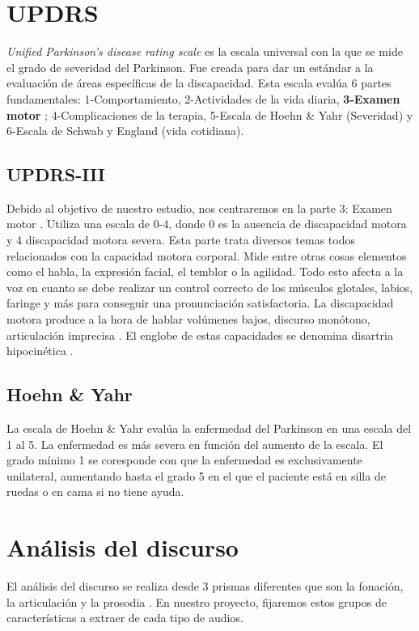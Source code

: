 \section{UPDRS}
\textit{Unified Parkinson's disease rating scale} \cite{updrs} es la escala universal con la que se mide el grado de severidad del Parkinson. Fue creada para dar un estándar a la evaluación de áreas específicas de la discapacidad. Esta escala evalúa 6 partes fundamentales: 1-Comportamiento, 2-Actividades de la vida diaria, \textbf{3-Examen motor} \cite{updrs3}; 4-Complicaciones de la terapia, 5-Escala de Hoehn \& Yahr (Severidad) \cite{hoehn1967} y 6-Escala de Schwab y England (vida cotidiana).\\
\subsection{UPDRS-III}
Debido al objetivo de nuestro estudio, nos centraremos en la parte 3: Examen motor \cite{updrs3}. Utiliza una escala de 0-4, donde 0 es la ausencia de discapacidad motora y 4 discapacidad motora severa. Esta parte trata diversos temas todos relacionados con la capacidad motora corporal. Mide entre otras cosas elementos como el habla, la expresión facial, el temblor o la agilidad. Todo esto afecta a la voz en cuanto se debe realizar un control correcto de los músculos glotales, labios, faringe y más para conseguir una pronunciación satisfactoria. La discapacidad motora  produce a la hora de hablar volúmenes bajos, discurso monótono, articulación imprecisa \cite{Orz2016}. El englobe de estas capacidades se denomina disartria hipocinética \cite{disartia}.

\subsection{Hoehn \& Yahr}
La escala de Hoehn \& Yahr \cite{hoehn1967} evalúa la enfermedad del Parkinson en una escala del 1 al 5. La enfermedad es más severa en función del aumento de la escala. El grado mínimo 1 se coresponde con que la enfermedad es exclusivamente unilateral, aumentando hasta el grado 5 en el que el paciente está en silla de ruedas o en cama si no tiene ayuda.

\section{Análisis del discurso}
El análisis del discurso se realiza desde 3 prismas diferentes que son la fonación, la articulación y la prosodia \cite{speechAnalysis}. En nuestro proyecto, fijaremos estos grupos de características a extraer de cada tipo de audios.

